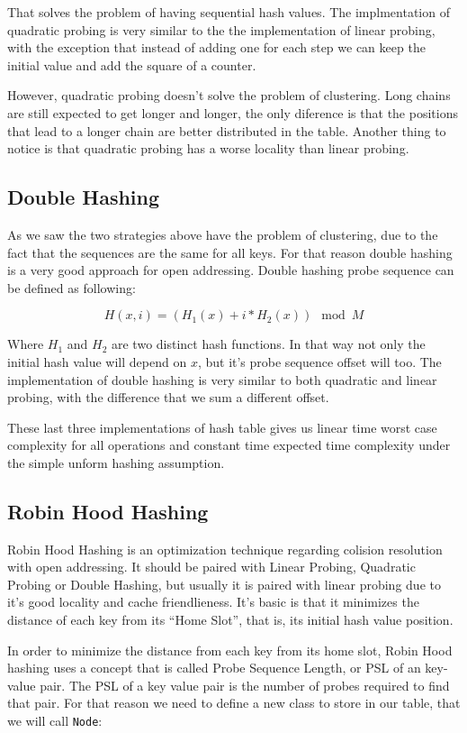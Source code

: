 That solves the problem of having sequential hash values. The implmentation of quadratic probing is very similar to the the implementation of linear probing, with the exception that instead of adding one for each step we can keep the initial value and add the square of a counter.

However, quadratic probing doesn't solve the problem of clustering. Long chains are still expected to get longer and longer, the only diference is that the positions that lead to a longer chain are better distributed in the table. Another thing to notice is that quadratic probing has a worse locality than linear probing. 

\subsection{Double Hashing}

As we saw the two strategies above have the problem of clustering, due to the fact that the sequences are the same for all keys. For that reason double hashing is a very good approach for open addressing. Double hashing probe sequence can be defined as following:

\[ H(x, i) = (H_1(x) + i * H_2(x)) \mod M \]

Where \( H_1 \) and \( H_2 \) are two distinct hash functions. In that way not only the initial hash value will depend on \( x \), but it's probe sequence offset will too. The implementation of double hashing is very similar to both quadratic and linear probing, with the difference that we sum a different offset.

These last three implementations of hash table gives us linear time worst case complexity for all operations and constant time expected time complexity under the simple unform hashing assumption.

\subsection{Robin Hood Hashing}

Robin Hood Hashing is an optimization technique regarding colision resolution with open addressing. It should be paired with Linear Probing, Quadratic Probing or Double Hashing, but usually it is paired with linear probing due to it's good locality and cache friendlieness. It's basic is that it minimizes the distance of each key from its ``Home Slot'', that is, its initial hash value position. \citep{RobinHoodHashing}

In order to minimize the distance from each key from its home slot, Robin Hood hashing uses a concept that is called Probe Sequence Length, or PSL of an key-value pair. The PSL of a key value pair is the number of probes required to find that pair. For that reason we need to define a new class to store in our table, that we will call \texttt{Node}:

